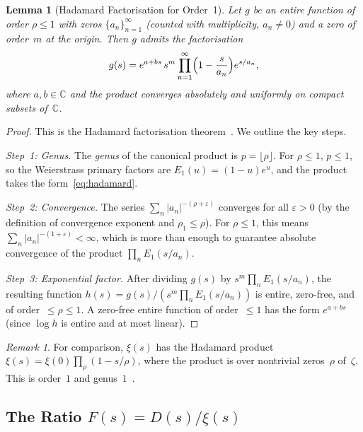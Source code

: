 \documentclass[11pt,a4paper]{article}
\theoremstyle{plain}
\newtheorem{lemma}[theorem]{Lemma}
\theoremstyle{remark}
\newtheorem{remark}[theorem]{Remark}
\newcommand{\C}{\mathbb{C}}
\begin{document}
\begin{lemma}[Hadamard Factorisation for Order~1]\label{lem:hadamard}
Let $g$ be an entire function of order $\rho\leq 1$ with zeros
$\{a_n\}_{n=1}^\infty$ (counted with multiplicity, $a_n\neq 0$) and a
zero of order~$m$ at the origin.  Then $g$ admits the factorisation
\begin{equation}\label{eq:hadamard}
  g(s)=e^{a+bs}\,s^m\prod_{n=1}^\infty\Bigl(1-\frac{s}{a_n}\Bigr)
  e^{s/a_n},
\end{equation}
where $a,b\in\C$ and the product converges absolutely and uniformly on
compact subsets of~$\C$.
\end{lemma}

\begin{proof}
This is the Hadamard factorisation
theorem~\cite{boas1954,levin1996,titchmarsh1939}.  We outline the key steps.

\emph{Step~1: Genus.}
The \emph{genus} of the canonical product is $p=\lfloor\rho\rfloor$.
For $\rho\leq 1$, $p\leq 1$, so the Weierstrass primary factors are
$E_1(u)=(1-u)e^u$, and the product takes the
form~\eqref{eq:hadamard}.

\emph{Step~2: Convergence.}
The series $\sum_n|a_n|^{-(\rho+\varepsilon)}$ converges for all
$\varepsilon>0$ (by the definition of convergence exponent and
$\rho_1\leq\rho$).  For $\rho\leq 1$, this means $\sum_n|a_n|^{-(1+\varepsilon)}<\infty$,
which is more than enough to guarantee absolute convergence of the
product $\prod_n E_1(s/a_n)$.

\emph{Step~3: Exponential factor.}
After dividing $g(s)$ by $s^m\prod_n E_1(s/a_n)$, the resulting
function $h(s)=g(s)/(s^m\prod_n E_1(s/a_n))$ is entire, zero-free,
and of order~$\leq\rho\leq 1$.  A zero-free entire function of
order~$\leq 1$ has the form $e^{a+bs}$ (since $\log h$ is entire
and at most linear).
\end{proof}

\begin{remark}
For comparison, $\xi(s)$ has the Hadamard product
$\xi(s)=\xi(0)\prod_\rho(1-s/\rho)$, where the product is over
nontrivial zeros~$\rho$ of~$\zeta$.  This is order~$1$ and
genus~$1$~\cite{titchmarsh1986,davenport2000}.
\end{remark}

\subsection{The Ratio $F(s)=D(s)/\xi(s)$}
\end{document}
